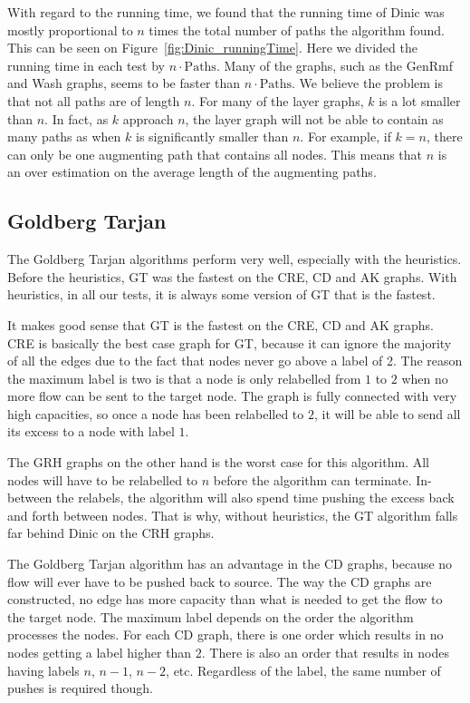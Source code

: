 With regard to the running time, we found that the running time of Dinic was mostly proportional to $n$ times the total number of paths the algorithm found.
This can be seen on Figure~\ref{fig:Dinic_runningTime}.
Here we divided the running time in each test by $n\cdot \text{Paths}$.
Many of the graphs, such as the GenRmf and Wash graphs, seems to be faster than $n\cdot\text{Paths}$. 
We believe the problem is that not all paths are of length $n$. For many of the layer graphs, $k$ is a lot smaller than $n$.
In fact, as $k$ approach $n$, the layer graph will not be able to contain as many paths as when $k$ is significantly smaller than $n$.
For example, if $k=n$, there can only be one augmenting path that contains all nodes.
This means that $n$ is an over estimation on the average length of the augmenting paths.

\subsection{Goldberg Tarjan}

The Goldberg Tarjan algorithms perform very well, especially with the heuristics.
Before the heuristics, GT was the fastest on the CRE, CD and AK graphs. 
With heuristics, in all our tests, it is always some version of GT that is the fastest.

It makes good sense that GT is the fastest on the CRE, CD and AK graphs. CRE is basically the best case graph for GT, because it can ignore the majority of all the edges due to the fact that nodes never go above a label of 2.
The reason the maximum label is two is that a node is only relabelled from $1$ to $2$ when no more flow can be sent to the target node.
The graph is fully connected with very high capacities, so once a node has been relabelled to $2$, it will be able to send all its excess to a node with label $1$.

The GRH graphs on the other hand is the worst case for this algorithm.
All nodes will have to be relabelled to $n$ before the algorithm can terminate. In-between the relabels, the algorithm will also spend time pushing the excess back and forth between nodes.
That is why, without heuristics, the GT algorithm falls far behind Dinic on the CRH graphs.

The Goldberg Tarjan algorithm has an advantage in the CD graphs, because no flow will ever have to be pushed back to source. 
The way the CD graphs are constructed, no edge has more capacity than what is needed to get the flow to the target node.
The maximum label depends on the order the algorithm processes the nodes. For each CD graph, there is one order which results in no nodes getting a label higher than $2$.
There is also an order that results in nodes having labels $n$, $n-1$, $n-2$, etc. Regardless of the label, the same number of pushes is required though.



